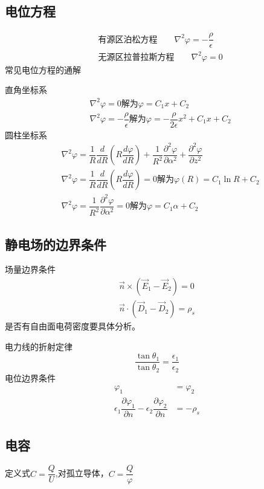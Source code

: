 \documentclass{ctexart}
\begin{document}
\subsection{电位方程}
\begin{align}
    &\text{有源区泊松方程}\qquad \nabla^2 \varphi = -\dfrac{\rho}{\epsilon}\\
    &\text{无源区拉普拉斯方程}\qquad\nabla^2 \varphi = 0
\end{align}
常见电位方程的通解

直角坐标系
\begin{align}
    &\nabla^2 \varphi = 0 \text{解为} \varphi = C_1 x+C_2\\
    &\nabla^2 \varphi = -\dfrac{\rho}{\epsilon} \text{解为}\varphi = -\dfrac{\rho}{2\epsilon}x^2+C_1 x+C_2
\end{align}
圆柱坐标系
\begin{align}
    &\nabla^2 \varphi = \dfrac{1}{R}\dfrac{d}{dR}(R\dfrac{d\varphi}{dR}) +\dfrac{1}{R^2}\dfrac{\partial^2 \varphi}{\partial \alpha^2}+\dfrac{\partial^2 \varphi}{\partial z^2}\\
    &\nabla^2 \varphi = \dfrac{1}{R}\dfrac{d}{dR}(R\dfrac{d\varphi}{dR})=0 \text{解为}\varphi(R)=C_1\ln R+C_2\\
    &\nabla^2 \varphi = \dfrac{1}{R^2}\dfrac{\partial^2 \varphi}{\partial \alpha^2}=0\text{解为}\varphi =C_1 \alpha +C_2
\end{align}
\subsection{静电场的边界条件}
场量边界条件
\begin{align}
    \vec{n}\times (\vec{E}_1-\vec{E}_2)=0\\
    \vec{n}\cdot (\vec{D}_1-\vec{D}_2)=\rho_s
\end{align}
是否有自由面电荷密度要具体分析。

电力线的折射定律
\begin{equation}
    \dfrac{\tan \theta_1}{\tan \theta_2}=\dfrac{\epsilon_1}{\epsilon_2}
\end{equation}
电位边界条件
\begin{align}
    \varphi_1&=\varphi_2\\
    \epsilon_1 \dfrac{\partial \varphi_1}{\partial n}-\epsilon_2 \dfrac{\partial \varphi_2}{\partial n}&=-\rho_s
\end{align}
\subsection{电容}
定义式$C=\dfrac{Q}{U}$,对孤立导体，$C=\dfrac{Q}{\varphi}$
\end{document}
